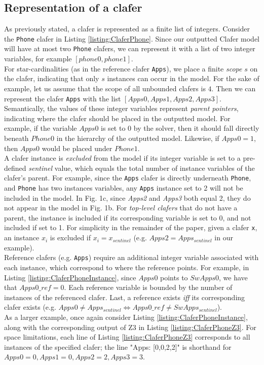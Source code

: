 \documentclass{article}
\begin{document}
\subsection{Representation of a clafer}
As previously stated, a clafer is represented as a finite list of integers. Consider the \texttt{Phone} clafer in Listing \ref{listing:ClaferPhone}. Since our outputted Clafer model will have at most two \texttt{Phone} clafers, we can represent it with a list of two integer variables, for example $[phone0, phone1]$.  \\
\indent For star-cardinalities (as in the reference clafer \texttt{Apps}), we place a finite \textit{scope} $s$ on the clafer, indicating that only $s$ instances can occur in the model. For the sake of example, let us assume that the scope of all unbounded clafers is $4$. Then we can represent the clafer \texttt{Apps} with the list $[Apps0, Apps1, Apps2, Apps3]$.\\
\indent Semantically, the values of these integer variables represent \textit{parent pointers}, indicating where the clafer should be placed in the outputted model. For example, if the variable $Apps0$ is set to $0$ by the solver, then it should fall directly beneath $Phone0$ in the hierarchy of the outputted model. Likewise, if $Apps0 = 1$, then $Apps0$ would be placed under $Phone1$.\\
\indent A clafer instance is \textit{excluded} from the model if its integer variable is set to a pre-defined \textit{sentinel} value, which equals the total number of instance variables of the clafer's parent. For example, since the \texttt{Apps} clafer is directly underneath \texttt{Phone}, and \texttt{Phone} has two instances variables, any \texttt{Apps} instance set to 2 will not be included in the model. In Fig. 1c, since \textit{Apps2} and \textit{Apps3} both equal 2, they do not appear in the model in Fig. 1b. For \textit{top-level clafers} that do not have a parent, the instance is included if its corresponding variable is set to 0, and not included if set to 1. For simplicity in the remainder of the paper, given a clafer \texttt{x}, an instance \textit{$x_i$} is excluded if  $x_i = x_{sentinel}$ (e.g. $Apps2 = Apps_{sentinel}$ in our example). \\
\indent Reference clafers (e.g. \texttt{Apps}) require an additional integer variable associated with each instance, which correspond to where the reference points. For example, in Listing \ref{listing:ClaferPhoneInstance}, since $Apps0$ points to $SwApps0$, we have that $Apps0\_ref = 0$. Each reference variable is bounded by the number of instances of the referenced clafer. Last, a reference exists \textit{iff} its corresponding clafer exists (e.g. $Apps0 \ne Apps_{sentinel} \Leftrightarrow Apps0\_ref \ne SwApps_{sentinel}$).\\
\indent As a larger example, once again consider Listing \ref{listing:ClaferPhoneInstance}, along with the corresponding output of Z3 in Listing \ref{listing:ClaferPhoneZ3}. For space limitations, each line of Listing \ref{listing:ClaferPhoneZ3} corresponds to all instances of the specified clafer; the line "Apps: [0,0,2,2]" is shorthand for $Apps0 = 0, Apps1 = 0, Apps2 = 2, Apps3 = 3$. 
\end{document}
